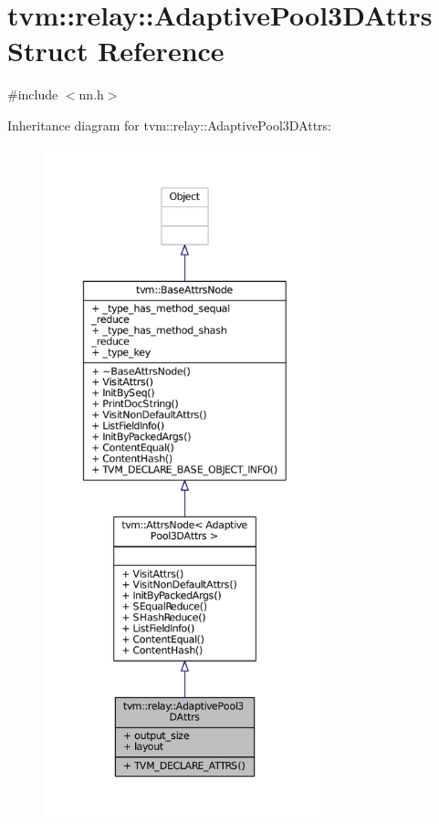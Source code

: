\hypertarget{structtvm_1_1relay_1_1AdaptivePool3DAttrs}{}\section{tvm\+:\+:relay\+:\+:Adaptive\+Pool3\+D\+Attrs Struct Reference}
\label{structtvm_1_1relay_1_1AdaptivePool3DAttrs}


{\ttfamily \#include $<$nn.\+h$>$}



Inheritance diagram for tvm\+:\+:relay\+:\+:Adaptive\+Pool3\+D\+Attrs\+:
\nopagebreak
\begin{figure}[H]
\begin{center}
\leavevmode
\includegraphics[height=550pt]{structtvm_1_1relay_1_1AdaptivePool3DAttrs__inherit__graph}
\end{center}
\end{figure}


